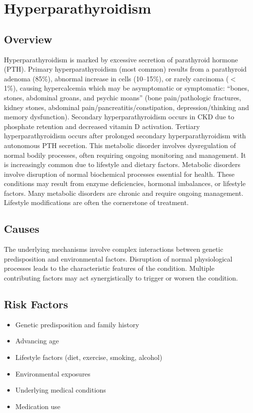 \chapter{Hyperparathyroidism}
\label{sec:Hyperparathyroidism}

\section{Overview}
Hyperparathyroidism is marked by excessive secretion of parathyroid hormone (PTH). Primary hyperparathyroidism (most common) results from a parathyroid adenoma (85\%), abnormal increase in cells (10--15\%), or rarely carcinoma ($<$1\%), causing hypercalcemia which may be asymptomatic or symptomatic: ``bones, stones, abdominal groans, and psychic moans'' (bone pain/pathologic fractures, kidney stones, abdominal pain/pancreatitis/constipation, depression/thinking and memory dysfunction). Secondary hyperparathyroidism occurs in CKD due to phosphate retention and decreased vitamin D activation. Tertiary hyperparathyroidism occurs after prolonged secondary hyperparathyroidism with autonomous PTH secretion. This metabolic disorder involves dysregulation of normal bodily processes, often requiring ongoing monitoring and management. It is increasingly common due to lifestyle and dietary factors. Metabolic disorders involve disruption of normal biochemical processes essential for health. These conditions may result from enzyme deficiencies, hormonal imbalances, or lifestyle factors. Many metabolic disorders are chronic and require ongoing management. Lifestyle modifications are often the cornerstone of treatment.
\section{Causes}
The underlying mechanisms involve complex interactions between genetic predisposition and environmental factors. Disruption of normal physiological processes leads to the characteristic features of the condition. Multiple contributing factors may act synergistically to trigger or worsen the condition.
\section{Risk Factors}
\begin{itemize}[noitemsep]
  \item Genetic predisposition and family history
  \item Advancing age
  \item Lifestyle factors (diet, exercise, smoking, alcohol)
  \item Environmental exposures
  \item Underlying medical conditions
  \item Medication use
\end{itemize}
